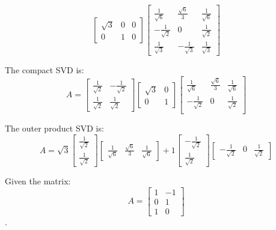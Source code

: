 \begin{enumerate}
{\begin{equation}
      \begin{bmatrix} \sqrt{3} & 0 & 0 \\ 0 & 1 & 0 \end{bmatrix}
      \begin{bmatrix} \frac{1}{\sqrt{6}} & \frac{\sqrt{6}}{3} & \frac{1}{\sqrt{6}} \\
      -\frac{1}{\sqrt{2}} & 0 & \frac{1}{\sqrt{2}} \\
      \frac{1}{\sqrt{3}} & - \frac{1}{\sqrt{3}} & \frac{1}{\sqrt{3}} \end{bmatrix}
    \end{equation}

    The compact SVD is:
    \begin{equation}
      A = \begin{bmatrix} \frac{1}{\sqrt{2}} & -\frac{1}{\sqrt{2}} \\ \frac{1}{\sqrt{2}} & \frac{1}{\sqrt{2}} \end{bmatrix}
      \begin{bmatrix} \sqrt{3} & 0 \\ 0 & 1 \end{bmatrix}
      \begin{bmatrix} \frac{1}{\sqrt{6}} & \frac{\sqrt{6}}{3} & \frac{1}{\sqrt{6}} \\
      -\frac{1}{\sqrt{2}} & 0 & \frac{1}{\sqrt{2}} \\ \end{bmatrix}
    \end{equation}

    The outer product SVD is:
    \begin{equation}
      A = \sqrt{3} \begin{bmatrix} \frac{1}{\sqrt{2}} \\ \frac{1}{\sqrt{2}} \end{bmatrix} \begin{bmatrix} \frac{1}{\sqrt{6}} & \frac{\sqrt{6}}{3} & \frac{1}{\sqrt{6}} \end{bmatrix}
        + 1 \begin{bmatrix} -\frac{1}{\sqrt{2}} \\ \frac{1}{\sqrt{2}} \end{bmatrix} \begin{bmatrix} -\frac{1}{\sqrt{2}} & 0 & \frac{1}{\sqrt{2}} \end{bmatrix}
    \end{equation}
  }

  \newpage
  \qitem Given the matrix:
  $$A = \begin{bmatrix}
    1 & -1 \\
    0 & 1 \\
    1 & 0
  \end{bmatrix}$$.


\end{enumerate}
